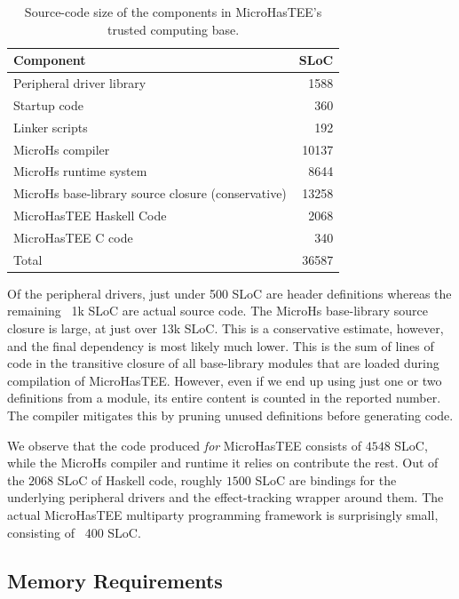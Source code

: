 \documentclass[sigconf]{acmart}
\begin{document}
\begin{table}[ht]
  \caption{Source-code size of the components in MicroHasTEE's trusted computing base.}
  \label{table:tcb}
  \centering
  \begin{tabular}{lr}
    \toprule
    Component & SLoC \\
    \midrule
    Peripheral driver library & 1588 \\
    Startup code & 360 \\
    Linker scripts & 192 \\
    \addlinespace
    MicroHs compiler & 10137 \\
    MicroHs runtime system & 8644 \\
    MicroHs base-library source closure (conservative) & 13258 \\
    \addlinespace
    MicroHasTEE Haskell Code & 2068 \\
    MicroHasTEE C code & 340 \\
    \midrule
    Total & 36587 \\
    \bottomrule
  \end{tabular}
\end{table}

Of the peripheral drivers, just under 500 SLoC are header definitions whereas the remaining ~1k SLoC are actual source code.
The MicroHs base-library source closure is large, at just over 13k SLoC.
This is a conservative estimate, however, and the final dependency is most likely much lower.
This is the sum of lines of code in the transitive closure of all base-library modules that are loaded during compilation of MicroHasTEE.
However, even if we end up using just one or two definitions from a module, its entire content is counted in the reported number.
The compiler mitigates this by pruning unused definitions before generating code.

We observe that the code produced \textit{for} MicroHasTEE consists of \(4548\) SLoC, while the MicroHs compiler and runtime it relies on contribute the rest.
Out of the \(2068\) SLoC of Haskell code, roughly \(1500\) SLoC are bindings for the underlying peripheral drivers and the effect-tracking wrapper around them.
The actual MicroHasTEE multiparty programming framework is surprisingly small, consisting of ~400 SLoC.

\subsection{Memory Requirements}
\end{document}
